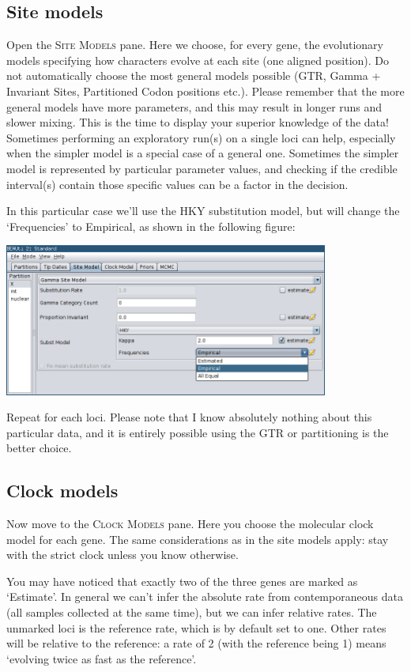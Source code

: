 \documentclass[a4paper,11pt]{article}
\begin{document}
\subsection{Site models}

Open the \textsc{Site Models} pane. Here we choose, for every gene, the
evolutionary models specifying how characters evolve at each site (one aligned
position). Do not automatically choose the most general models possible (GTR,
Gamma + Invariant Sites, Partitioned Codon positions etc.). Please remember
that the more general models have more parameters, and this may result in
longer runs and slower mixing. This is the time to display your superior
knowledge of the data! Sometimes performing an exploratory run(s) on a single
loci can help, especially when the simpler model is a special case of a general
one. Sometimes the simpler model is represented by particular parameter values,
and checking if the credible interval(s) contain those specific values can be a
factor in the decision.

In this particular case we'll use the HKY substitution model, but will change
the `Frequencies' to Empirical, as shown in the following figure:

    \includegraphics[width=0.8\textwidth]{figures/site_model.png}

Repeat for each loci. Please note that I know absolutely nothing about
this particular data, and it is entirely possible using the GTR or partitioning
is the better choice.

\subsection{Clock models}

Now move to the \textsc{Clock Models} pane. Here you choose the molecular clock
model for each gene. The same considerations as in the site models apply: stay
with the strict clock unless you know otherwise.

You may have noticed that exactly two of the three genes are marked as
`Estimate'. In general we can't infer the absolute rate from contemporaneous
data (all samples collected at the same time), but we can infer relative rates.
The unmarked loci is the reference rate, which is by default set to one. Other
rates will be relative to the reference: a rate of 2 (with the reference being
1) means `evolving twice as fast as the reference'.
\end{document}
